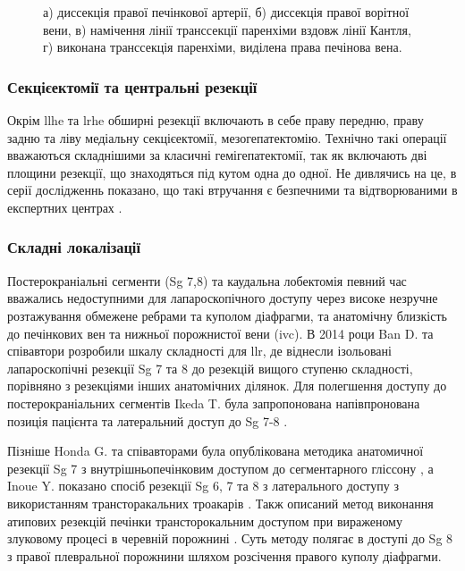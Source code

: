 \begin{refsection}
\begin{figure}[htbp]
\medskip
\small
а) диссекція правої печінкової артерії, б) диссекція правої ворітної вени, в) намічення лінії транссекції паренхіми вздовж лінії Кантля, г) виконана транссекція паренхіми, виділена права печінова вена.


\end{figure}

\subsubsection{Секцієектомії та центральні резекції}

Окрім \acrshort{llhe} та \acrshort{lrhe} обширні резекції включають в себе праву передню, праву задню та ліву медіальну секцієектомії, мезогепатектомію. Технічно такі операції вважаються складнішими за класичні гемігепатектомії, так як включають дві площини резекції, що знаходяться під кутом одна до одної. Не дивлячись на це, в серії дослідженнь показано, що такі втручання є безпечними та відтворюваними в експертних центрах \cite{Honda2014, Cheng2015, Kim2017, Siddiqi2018}. 

\subsubsection{Складні локалізації}

Постерокраніальні сегменти (Sg 7,8) та каудальна лобектомія певний час вважались недоступними для лапароскопічного доступу через високе незручне розтажування обмежене ребрами та куполом діафрагми, та анатомічну близкість до печінкових вен та нижньої порожнистої вени (\acrshort{ivc}). В 2014 роци Ban D. та співавтори розробили шкалу складності для \acrshort{llr}, де віднесли ізольовані лапароскопічні резекції Sg 7 та 8 до резекцій вищого ступеню складності, порівняно з резекціями інших анатомічних ділянок. Для полегшення доступу до постерокраніальних сегментів Ikeda T. була запропонована напівпронована позиція пацієнта та латеральний доступ до Sg 7-8 \cite{Ikeda2014}.

Пізніше Honda G. та співавторами була опублікована методика анатомичної резекції Sg 7 з внутрішньопечінковим доступом до сегментарного  гліссону \cite{Okuda2017}, а Inoue Y. показано спосіб резекції Sg 6, 7 та 8 з латерального доступу з використанням трансторакальних троакарів \cite{Inoue2017}.  Такж описаний метод виконання атипових резекцій печінки трансторокальним доступом при вираженому злуковому процесі в черевній порожнині \cite{Kruger2014}. Суть методу полягає в доступі до Sg 8 з правої плевральної порожнини шляхом розсічення правого куполу діафрагми.


\end{refsection}
